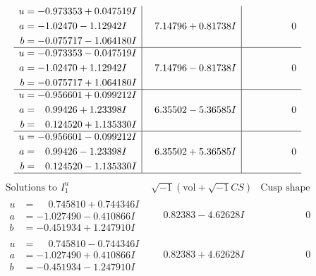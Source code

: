 \documentclass[1p]{elsarticle_modified}
\theoremstyle{definition}
\newcommand{\I}{\sqrt{-1}}
\begin{document}
$$\begin{array}{c|c|c}
\begin{aligned}
u &= -0.973353 + 0.047519 I \\
a &= -1.02470 - 1.12942 I \\
b &= -0.075717 - 1.064180 I\end{aligned}
 & \phantom{-}7.14796 + 0.81738 I & \phantom{-0.000000 } 0 \\ \hline\begin{aligned}
u &= -0.973353 - 0.047519 I \\
a &= -1.02470 + 1.12942 I \\
b &= -0.075717 + 1.064180 I\end{aligned}
 & \phantom{-}7.14796 - 0.81738 I & \phantom{-0.000000 } 0 \\ \hline\begin{aligned}
u &= -0.956601 + 0.099212 I \\
a &= \phantom{-}0.99426 + 1.23398 I \\
b &= \phantom{-}0.124520 + 1.135330 I\end{aligned}
 & \phantom{-}6.35502 - 5.36585 I & \phantom{-0.000000 } 0 \\ \hline\begin{aligned}
u &= -0.956601 - 0.099212 I \\
a &= \phantom{-}0.99426 - 1.23398 I \\
b &= \phantom{-}0.124520 - 1.135330 I\end{aligned}
 & \phantom{-}6.35502 + 5.36585 I & \phantom{-0.000000 } 0\\
 \hline 
 \end{array}$$\newpage$$\begin{array}{c|c|c}  
\text{Solutions to }I^u_{1}& \I (\text{vol} + \sqrt{-1}CS) & \text{Cusp shape}\\
 \hline 
\begin{aligned}
u &= \phantom{-}0.745810 + 0.744346 I \\
a &= -1.027490 - 0.410866 I \\
b &= -0.451934 + 1.247910 I\end{aligned}
 & \phantom{-}0.82383 - 4.62628 I & \phantom{-0.000000 } 0 \\ \hline\begin{aligned}
u &= \phantom{-}0.745810 - 0.744346 I \\
a &= -1.027490 + 0.410866 I \\
b &= -0.451934 - 1.247910 I\end{aligned}
 & \phantom{-}0.82383 + 4.62628 I & \phantom{-0.000000 } 0 \\ \hline\begin{aligned}

\end{aligned}
\end{array}$$
\end{document}

